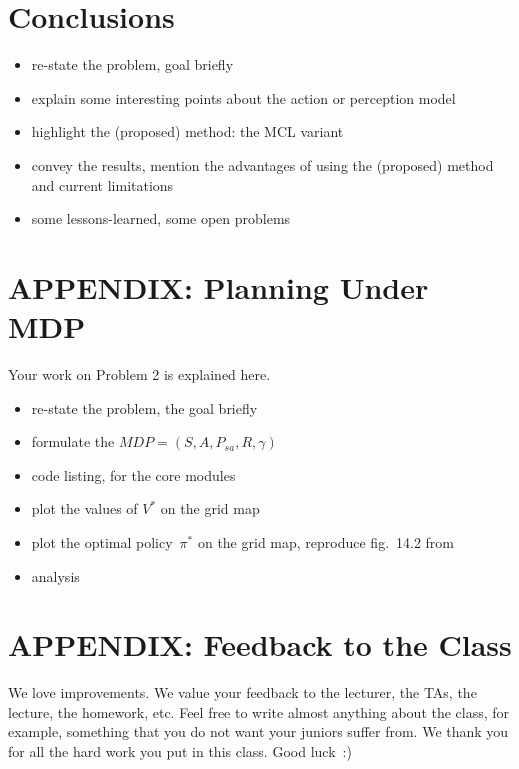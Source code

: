 \documentclass[letterpaper, 10 pt, conference]{ieeeconf}  %
\begin{document}
\section{Conclusions}
\begin{itemize}
    \item re-state the problem, goal briefly
    \item explain some interesting points about the action or perception model
    \item highlight the (proposed) method: the MCL variant
    \item convey the results, mention the advantages of using the (proposed) method and current limitations
    \item some lessons-learned, some open problems
\end{itemize}

\section*{APPENDIX: Planning Under MDP}
Your work on Problem 2 is explained here.
\begin{itemize}
    \item re-state the problem, the goal briefly
    \item formulate the $MDP=(S, A, P_{sa}, R, \gamma)$
    \item code listing, for the core modules
    \item plot the values of $V^*$ on the grid map
    \item plot the optimal policy~$\pi^*$ on the grid map, reproduce fig.~14.2 from~\cite{Thrun:2005:PR}
    \item analysis
\end{itemize}

\section*{APPENDIX: Feedback to the Class}
We love improvements.
We value your feedback to the lecturer, the TAs, the lecture, the homework, etc.
Feel free to write almost anything about the class, for example, something that you do not want your juniors suffer from.
We thank you for all the hard work you put in this class.
Good luck~:)


\end{document}
